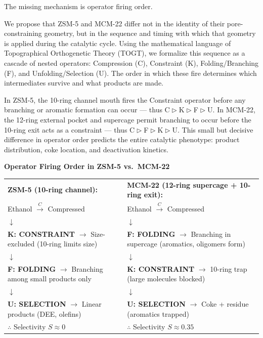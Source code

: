\documentclass[11pt]{article}
\newcommand{\comp}{\mathrel{\triangleright}} %
\begin{document}
The missing mechanism is operator firing order.

We propose that ZSM-5 and MCM-22 differ not in the identity of their pore-constraining geometry, but in the sequence and timing with which that geometry is applied during the catalytic cycle. Using the mathematical language of Topographical Orthogenetic Theory (TOGT), we formalize this sequence as a cascade of nested operators: Compression (C), Constraint (K), Folding/Branching (F), and Unfolding/Selection (U). The order in which these fire determines which intermediates survive and what products are made.

In ZSM-5, the 10-ring channel mouth fires the Constraint operator before any branching or aromatic formation can occur --- thus C$\comp$K$\comp$F$\comp$U. In MCM-22, the 12-ring external pocket and supercage permit branching to occur before the 10-ring exit acts as a constraint --- thus C$\comp$F$\comp$K$\comp$U. This small but decisive difference in operator order predicts the entire catalytic phenotype: product distribution, coke location, and deactivation kinetics.

\bigskip
\noindent\textbf{Operator Firing Order in ZSM-5 vs.\ MCM-22}
\begin{center}
\begin{tabular}{p{} p{}}
\textbf{ZSM-5 (10-ring channel):} & \textbf{MCM-22 (12-ring supercage + 10-ring exit):} \\[4pt]
Ethanol $\xrightarrow{C}$ Compressed & Ethanol $\xrightarrow{C}$ Compressed \\[2pt]
$\downarrow$ & $\downarrow$ \\
\textbf{K: CONSTRAINT} $\to$ Size-excluded (10-ring limits size) & \textbf{F: FOLDING} $\to$ Branching in supercage (aromatics, oligomers form) \\
$\downarrow$ & $\downarrow$ \\
\textbf{F: FOLDING} $\to$ Branching among small products only & \textbf{K: CONSTRAINT} $\to$ 10-ring trap (large molecules blocked) \\
$\downarrow$ & $\downarrow$ \\
\textbf{U: SELECTION} $\to$ Linear products (DEE, olefins) & \textbf{U: SELECTION} $\to$ Coke + residue (aromatics trapped) \\[4pt]
$\therefore$ Selectivity $S \approx 0$ & $\therefore$ Selectivity $S \approx 0.35$
\end{tabular}
\end{center}
\bigskip
\end{document}
